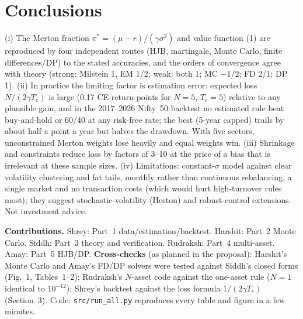 \documentclass[10pt,a4paper]{article}
\begin{document}
\section{Conclusions}
(i) The Merton fraction $\pi^*=(\mu-r)/(\gamma\sigma^2)$ and value function (1) are reproduced by four independent routes (HJB, martingale, Monte Carlo, finite differences/DP) to the stated accuracies, and the orders of convergence agree with theory (strong: Milstein 1, EM 1/2; weak: both 1; MC $-1/2$; FD 2/1; DP 1). (ii) In practice the limiting factor is estimation error: expected loss $N/(2\gamma T_e)$ is large (0.17 CE-return-points for $N{=}5$, $T_e{=}5$) relative to any plausible gain, and in the 2017--2026 Nifty~50 backtest no estimated rule beat buy-and-hold or 60/40 at any risk-free rate; the best (5-year capped) trails by about half a point a year but halves the drawdown. With five sectors, unconstrained Merton weights lose heavily and equal weights win. (iii) Shrinkage and constraints reduce loss by factors of 3--10 at the price of a bias that is irrelevant at these sample sizes. (iv) Limitations: constant-$\sigma$ model against clear volatility clustering and fat tails, monthly rather than continuous rebalancing, a single market and no transaction costs (which would hurt high-turnover rules most); they suggest stochastic-volatility (Heston) and robust-control extensions. Not investment advice.

\textbf{Contributions.} Shrey: Part~1 data/estimation/backtest. Harshit: Part~2 Monte Carlo. Siddh: Part~3 theory and verification. Rudraksh: Part~4 multi-asset. Amay: Part~5 HJB/DP. \textbf{Cross-checks} (as planned in the proposal): Harshit's Monte Carlo and Amay's FD/DP solvers were tested against Siddh's closed forms (Fig.~1, Tables~1--2); Rudraksh's $N$-asset code against the one-asset rule ($N{=}1$ identical to $10^{-12}$); Shrey's backtest against the loss formula $1/(2\gamma T_e)$ (Section~3). Code: \texttt{src/run\_all.py} reproduces every table and figure in a few minutes.
\end{document}
